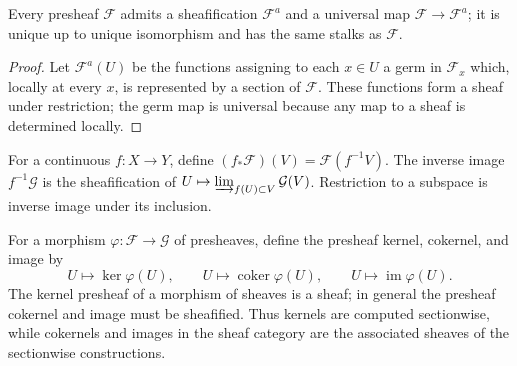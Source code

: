 \begin{proposition}[Sheafification]
\label{prop:II-1-2}
\leanok
Every presheaf $\mathcal F$ admits a sheafification $\mathcal F^a$ and a universal map
$\mathcal F\to\mathcal F^a$; it is unique up to unique isomorphism and has the same stalks as
$\mathcal F$.
\end{proposition}
\begin{proof}
Let $\mathcal F^a(U)$ be the functions assigning to each $x\in U$ a germ in $\mathcal F_x$ which,
locally at every $x$, is represented by a section of $\mathcal F$. These functions form a sheaf under
restriction; the germ map is universal because any map to a sheaf is determined locally.
\end{proof}

\begin{definition}
\label{def:II-1-direct-inverse}
\leanok
For a continuous $f:X\to Y$, define $(f_*\mathcal F)(V)=\mathcal F(f^{-1}V)$. The inverse image
$f^{-1}\mathcal G$ is the sheafification of $U\mapsto\varinjlim_{f(U)\subset V}\mathcal G(V)$.
Restriction to a subspace is inverse image under its inclusion.
\end{definition}

For a morphism $\varphi:\mathcal F\to\mathcal G$ of presheaves, define the presheaf kernel,
cokernel, and image by
\[
U\longmapsto\ker\varphi(U),\qquad U\longmapsto\operatorname{coker}\varphi(U),
\qquad U\longmapsto\operatorname{im}\varphi(U).
\]
The kernel presheaf of a morphism of sheaves is a sheaf; in general the presheaf cokernel and image
must be sheafified.  Thus kernels are computed sectionwise, while cokernels and images in the sheaf
category are the associated sheaves of the sectionwise constructions.

